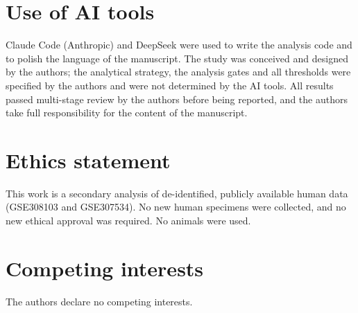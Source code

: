 \section*{Use of AI tools}
Claude Code (Anthropic) and DeepSeek were used to write the analysis code and to polish
the language of the manuscript. The study was conceived and designed by the authors; the
analytical strategy, the analysis gates and all thresholds were specified by the authors
and were not determined by the AI tools. All results passed multi-stage review by the
authors before being reported, and the authors take full responsibility for the content of
the manuscript.

\section*{Ethics statement}
This work is a secondary analysis of de-identified, publicly available human data
(GSE308103 and GSE307534). No new human specimens were collected, and no new ethical
approval was required. No animals were used.

\section*{Competing interests}
The authors declare no competing interests.
